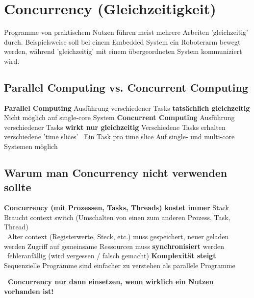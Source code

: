 \section{Concurrency (Gleichzeitigkeit)}

Programme von praktischem Nutzen führen meist mehrere Arbeiten 'gleichzeitig' durch. Beispielsweise soll bei einem Embedded System ein Roboterarm 
bewegt werden, während 'gleichzeitig' mit einem übergeordneten System kommuniziert wird.


\subsection{Parallel Computing vs. Concurrent Computing}


\begin{outline}
    \1 \textbf{Parallel Computing}
        \2 Ausführung verschiedener Tasks \textbf{tatsächlich gleichzeitig}
        \2 Nicht möglich auf single-core System
    \1 \textbf{Concurrent Computing}
        \2 Ausführung verschiedener Tasks \textbf{wirkt nur gleichzeitig}
        \2 Verschiedene Tasks erhalten verschiedene 'time slices' \textrightarrow\ Ein Task pro time slice
        \2 Auf single- und multi-core Systemen möglich
\end{outline}



\subsection{Warum man Concurrency nicht verwenden sollte}

\begin{outline}
    \1 \textbf{Concurrency (mit Prozessen, Tasks, Threads) kostet immer}
        \2 Stack
        \2 Braucht context switch (Umschalten von einen zum anderen Prozess, Task, Thread) \\
            \textrightarrow\ Alter context (Registerwerte, Steck, etc.) muss gespeichert, neuer geladen werden 
        \2 Zugriff auf gemeinsame Ressourcen muss \textbf{synchronisiert} werden \\
            \textrightarrow\ fehleranfällig (wird vergessen / falsch gemacht)
    \1 \textbf{Komplexität steigt}
        \2 Sequenzielle Programme sind einfacher zu verstehen als parallele Programme
\end{outline}

\vspace{0.1cm}

\textbf{ \textrightarrow\ Concurrency nur dann einsetzen, wenn wirklich ein Nutzen vorhanden ist!}


